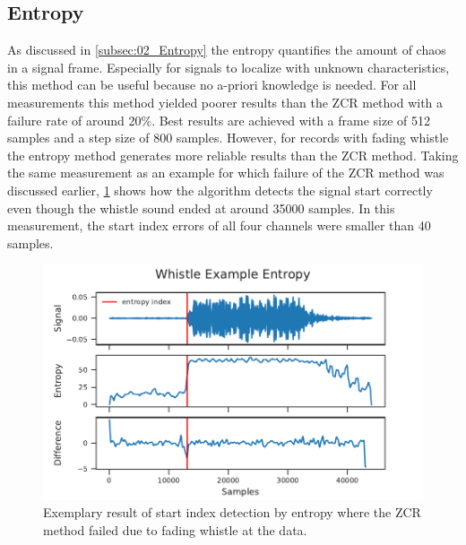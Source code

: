 \subsection{Entropy}
\label{subsec:04_entropy}

As discussed in \cref{subsec:02_Entropy} the entropy quantifies the amount
of chaos in a signal frame.
Especially for signals to localize with unknown characteristics,
this method can be useful because no a-priori knowledge is needed.
For all measurements this method yielded poorer results than the \ac{ZCR} method
with a failure rate of around 20\si{\percent}.
Best results are achieved with a frame size of 512 samples and a step size of 800
samples.
However, for records with fading whistle the entropy method
generates more reliable results than the \ac{ZCR} method.
Taking the same measurement as an example for which failure of the \ac{ZCR} method
was discussed earlier, \cref{fig:04_entropyGood} shows how the algorithm
detects the signal start correctly even though the whistle sound ended at
around 35000 samples. In this measurement, the start index errors of all four
channels were smaller than 40 samples.
\begin{figure}[ht]
	\centering
	\includegraphics[]{figures/evaluation/entropy_good}
	\caption{Exemplary result of start index detection by entropy where
			the \ac{ZCR} method failed due to fading whistle
			at the data.}
	\label{fig:04_entropyGood}
\end{figure}

